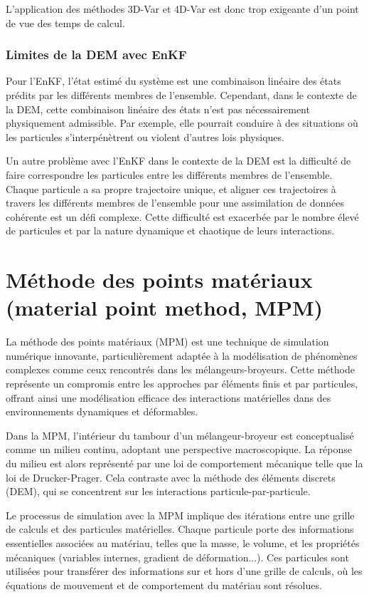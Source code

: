 L'application des méthodes 3D-Var et 4D-Var est donc trop exigeante d'un point de vue des temps de calcul.

\subsubsection{Limites de la DEM avec EnKF}
Pour l'EnKF, l'état estimé du système est une combinaison linéaire des états prédits par les différents membres de l'ensemble. Cependant, dans le contexte de la DEM, cette combinaison linéaire des états n'est pas nécessairement physiquement admissible. Par exemple, elle pourrait conduire à des situations où les particules s'interpénètrent ou violent d'autres lois physiques.

Un autre problème avec l'EnKF dans le contexte de la DEM est la difficulté de faire correspondre les particules entre les différents membres de l'ensemble. Chaque particule a sa propre trajectoire unique, et aligner ces trajectoires à travers les différents membres de l'ensemble pour une assimilation de données cohérente est un défi complexe. Cette difficulté est exacerbée par le nombre élevé de particules et par la nature dynamique et chaotique de leurs interactions.

\section{Méthode des points matériaux (material point method, MPM)}

La méthode des points matériaux (MPM) est une technique de simulation numérique innovante, particulièrement adaptée à la modélisation de phénomènes complexes comme ceux rencontrés dans les mélangeurs-broyeurs. Cette méthode représente un compromis entre les approches par éléments finis et par particules, offrant ainsi une modélisation efficace des interactions matérielles dans des environnements dynamiques et déformables.

Dans la MPM, l'intérieur du tambour d'un mélangeur-broyeur est conceptualisé comme un milieu continu, adoptant une perspective macroscopique. La réponse du milieu est alors représenté par une loi de comportement mécanique telle que la loi de Drucker-Prager. Cela contraste avec la méthode des éléments discrets (DEM), qui se concentrent sur les interactions particule-par-particule.

Le processus de simulation avec la MPM implique des itérations entre une grille de calculs et des particules matérielles. Chaque particule porte des informations essentielles associées au matériau, telles que la masse, le volume, et les propriétés mécaniques (variables internes, gradient de déformation...). Ces particules sont utilisées pour transférer des informations sur et hors d'une grille de calculs, où les équations de mouvement et de comportement du matériau sont résolues.


